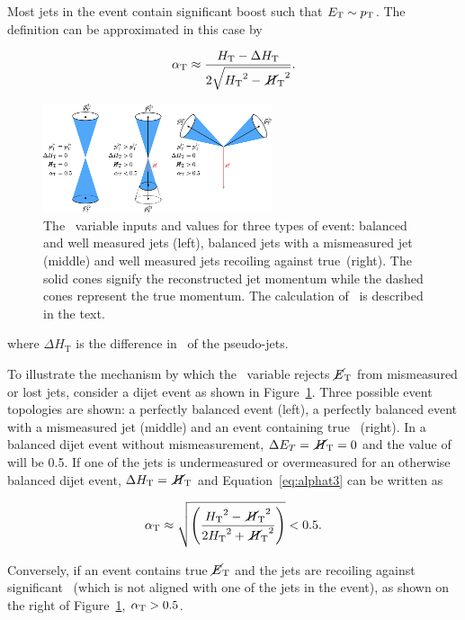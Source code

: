 Most jets in the event contain significant boost such that $E_{\textrm{T}} \sim {p_{\text T}}$. The \alphat 
definition can be approximated in this case by

\begin{equation}
  \label{eq:alphat3}
   \alpha_{\text{T}} \approx \frac{\mbox{$H_\text{T}$} - \Delta H_{\textrm{T}}}{2\sqrt{\mbox{$H_\text{T}$}^2 - \mbox{$\,\cancel{H}_{\rm T}$}^2}}.
\end{equation}

\begin{figure}
\centering
    \includegraphics[width=0.6\textwidth]{./Figures/alphat/alphat_cartoon}
  \caption{\label{fig:alphat_cartoon} The \alphat~variable inputs and values for three types of event: balanced and well measured jets (left), balanced jets with
  a mismeasured jet (middle) and well measured jets recoiling against true~\met (right). The solid cones signify the reconstructed jet momentum while the 
  dashed cones represent the true momentum. The calculation of \alphat~is described in the text.} 
\end{figure}
where $\Delta H_{\textrm{T}}$ is the difference in \pt~of the pseudo-jets.

To illustrate the mechanism by which the \alphat~variable rejects $\mbox{$\cancel{E}_\text{T}$}$ from mismeasured or lost jets,
consider a dijet event as shown in Figure~\ref{fig:alphat_cartoon}. Three possible event topologies are shown: 
a perfectly balanced event (left), a perfectly balanced event with a mismeasured jet (middle) and an event containing true \met~(right).
In a balanced dijet event without mismeasurement, $\Delta E_T = \mbox{$\,\cancel{H}_{\rm T}$} = 0$ and the 
value of \alphat will be 0.5. If one of the jets is undermeasured or overmeasured for an otherwise balanced dijet
event, $\Delta H_{\textrm{T}} = \mbox{$\,\cancel{H}_{\rm T}$}$ and Equation~\ref{eq:alphat3} can be written as 

\begin{equation}
  \label{eq:alphat4}
   \alpha_{\text{T}} \approx \sqrt{\left(\frac{\mbox{$H_\text{T}$}^2 - \mbox{$\,\cancel{H}_{\rm T}$}^2}{2\mbox{$H_\text{T}$}^2 + \mbox{$\,\cancel{H}_{\rm T}$}^2}\right)} < 0.5.
\end{equation}

Conversely, if an event contains true $\mbox{$\cancel{E}_\text{T}$}$ and the jets are recoiling against significant~\met 
(which is not aligned with one of the jets in the event), as shown on the right of 
Figure~\ref{fig:alphat_cartoon}, $\alpha_{\text{T}} > 0.5$. 

